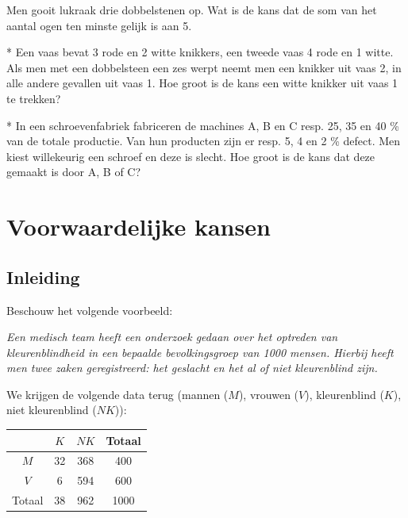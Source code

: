\documentclass[12pt,twoside]{article}
\begin{document}
\begin{oefening}
Men gooit lukraak drie dobbelstenen op. Wat is de kans dat de som van het aantal ogen ten minste gelijk is aan 5.
\end{oefening}

\begin{oefening}*
Een vaas bevat 3 rode en 2 witte knikkers, een tweede vaas 4 rode en 1 witte. Als men met een dobbelsteen een zes werpt neemt men een knikker uit vaas 2, in alle andere gevallen uit vaas 1. Hoe groot is de kans een witte knikker uit vaas 1 te trekken? 
\end{oefening}

\begin{oefening}*
In een schroevenfabriek fabriceren de machines A, B en C resp. 25, 35 en 40 \% van de totale productie. Van hun producten zijn er resp. 5, 4 en 2 \% defect. Men kiest willekeurig een schroef en deze is slecht. Hoe groot is de kans dat deze gemaakt
is door A, B of C?
\end{oefening}

\pagebreak
\section{Voorwaardelijke kansen}

\subsection{Inleiding}

Beschouw het volgende voorbeeld:

{\em Een medisch team heeft een onderzoek gedaan over het optreden van kleurenblindheid in een bepaalde bevolkingsgroep van 1000 mensen. Hierbij heeft men twee zaken geregistreerd: het geslacht en het al of niet kleurenblind zijn.}

We krijgen de volgende data terug (mannen ($M$), vrouwen ($V$), kleurenblind ($K$), niet kleurenblind ($NK$)):

\begin{center}
  \begin{tabular}{c|c|c|c}
         &  $K$ &  $NK$ & Totaal\\
  \hline
  $M$      & 32 & 368 & 400\\
  $V$      &  6 & 594 & 600\\
  \hline
  Totaal & 38 & 962 & 1000
  \end{tabular}
\end{center}
\end{document}
